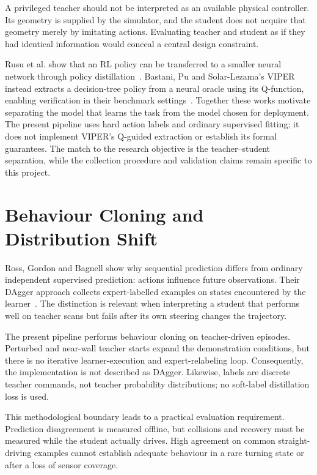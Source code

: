A privileged teacher should not be interpreted as an available physical
controller. Its geometry is supplied by the simulator, and the student does
not acquire that geometry merely by imitating actions. Evaluating teacher and
student as if they had identical information would conceal a central design
constraint.

Rusu et al. show that an RL policy can be transferred to a smaller neural
network through policy distillation~\cite{rusu2015distillation}. Bastani, Pu and
Solar-Lezama's VIPER instead extracts a decision-tree policy from a neural
oracle using its Q-function, enabling verification in their benchmark
settings~\cite{bastani2018viper}. Together these works motivate separating the
model that learns the task from the model chosen for deployment. The present
pipeline uses hard action labels and ordinary supervised fitting; it does not
implement VIPER's Q-guided extraction or establish its formal guarantees.
The match to the research objective is the teacher--student separation, while
the collection procedure and validation claims remain specific to this project.

\section{Behaviour Cloning and Distribution Shift}
Ross, Gordon and Bagnell show why sequential prediction differs from ordinary
independent supervised prediction: actions influence future observations.
Their DAgger approach collects expert-labelled examples on states encountered
by the learner~\cite{ross2011reduction}. The distinction is relevant when
interpreting a student that performs well on teacher scans but fails after its
own steering changes the trajectory.

The present pipeline performs behaviour cloning on teacher-driven episodes.
Perturbed and near-wall teacher starts expand the demonstration conditions,
but there is no iterative learner-execution and expert-relabeling loop.
Consequently, the implementation is not described as DAgger. Likewise, labels
are discrete teacher commands, not teacher probability distributions; no
soft-label distillation loss is used.

This methodological boundary leads to a practical evaluation requirement.
Prediction disagreement is measured offline, but collisions and recovery
must be measured while the student actually drives. High agreement on common
straight-driving examples cannot establish adequate behaviour in a rare
turning state or after a loss of sensor coverage.

